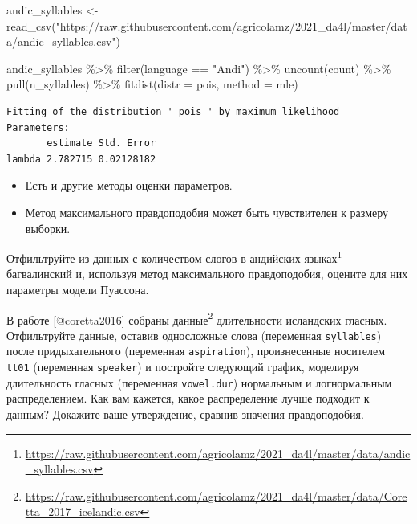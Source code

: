 \documentclass[
]{book}
\makeatletter
\newenvironment{Shaded}{\begin{snugshade}}{\end{snugshade}}
\newcommand{\AttributeTok}[1]{\textcolor[rgb]{0.77,0.63,0.00}{#1}}
\newcommand{\FunctionTok}[1]{\textcolor[rgb]{0.00,0.00,0.00}{#1}}
\newcommand{\NormalTok}[1]{#1}
\newcommand{\OtherTok}[1]{\textcolor[rgb]{0.56,0.35,0.01}{#1}}
\newcommand{\SpecialCharTok}[1]{\textcolor[rgb]{0.00,0.00,0.00}{#1}}
\newcommand{\StringTok}[1]{\textcolor[rgb]{0.31,0.60,0.02}{#1}}
\providecommand{\tightlist}{%
  \setlength{\itemsep}{0pt}\setlength{\parskip}{0pt}}
\renewcommand{\href}[2]{#2\footnote{\url{#1}}}
\newenvironment{kframe}{%
    \medskip{}
    \setlength{\fboxsep}{.8em}
    \def\at@end@of@kframe{}%
    \ifinner\ifhmode%
    \def\at@end@of@kframe{\end{minipage}}%
    \begin{minipage}{\columnwidth}%
    \fi\fi%
    \def\FrameCommand##1{\hskip\@totalleftmargin \hskip-\fboxsep
    \colorbox{shadecolor}{##1}\hskip-\fboxsep
        \hskip-\linewidth \hskip-\@totalleftmargin \hskip\columnwidth}%
    \MakeFramed {\advance\hsize-\width
      \@totalleftmargin\z@ \linewidth\hsize
      \@setminipage}}%
  {\par\unskip\endMakeFramed%
    \at@end@of@kframe}
\newenvironment{rmdblock}[1]
  {
    \begin{itemize}
    \renewcommand{\labelitemi}{
      \raisebox{-.7\height}[0pt][0pt]{
        {\setkeys{Gin}{width=3em,keepaspectratio}\texttt{[image: images/\#1]}}
        }
        }
        \setlength{\fboxsep}{1em}
        \begin{kframe}
        \item
      }
      {
        \end{kframe}
        \end{itemize}
      }
\newenvironment{rmdtask}
      {\begin{rmdblock}{task}}
      {\end{rmdblock}}
\makeatother
\begin{document}
\begin{Shaded}
\begin{Highlighting}[]
\NormalTok{andic\_syllables }\OtherTok{\textless{}{-}} \FunctionTok{read\_csv}\NormalTok{(}\StringTok{"https://raw.githubusercontent.com/agricolamz/2021\_da4l/master/data/andic\_syllables.csv"}\NormalTok{) }

\NormalTok{andic\_syllables }\SpecialCharTok{\%\textgreater{}\%} 
  \FunctionTok{filter}\NormalTok{(language }\SpecialCharTok{==} \StringTok{"Andi"}\NormalTok{) }\SpecialCharTok{\%\textgreater{}\%} 
  \FunctionTok{uncount}\NormalTok{(count) }\SpecialCharTok{\%\textgreater{}\%} 
  \FunctionTok{pull}\NormalTok{(n\_syllables) }\SpecialCharTok{\%\textgreater{}\%} 
  \FunctionTok{fitdist}\NormalTok{(}\AttributeTok{distr =} \StringTok{\textquotesingle{}pois\textquotesingle{}}\NormalTok{, }\AttributeTok{method =} \StringTok{\textquotesingle{}mle\textquotesingle{}}\NormalTok{)}
\end{Highlighting}
\end{Shaded}

\begin{verbatim}
Fitting of the distribution ' pois ' by maximum likelihood 
Parameters:
       estimate Std. Error
lambda 2.782715 0.02128182
\end{verbatim}

\begin{itemize}
\tightlist
\item
  Есть и другие методы оценки параметров.
\item
  Метод максимального правдоподобия может быть чувствителен к размеру выборки.
\end{itemize}

\begin{rmdtask}
Отфильтруйте из
\href{https://raw.githubusercontent.com/agricolamz/2021_da4l/master/data/andic_syllables.csv}{данных
с количеством слогов в андийских языках} багвалинский и, используя метод
максимального правдоподобия, оцените для них параметры модели Пуассона.
\end{rmdtask}

\begin{rmdtask}
В работе {[}@coretta2016{]} собраны
\href{https://raw.githubusercontent.com/agricolamz/2021_da4l/master/data/Coretta_2017_icelandic.csv}{данные}
длительности исландских гласных. Отфильтруйте данные, оставив
односложные слова (переменная \texttt{syllables}) после придыхательного
(переменная \texttt{aspiration}), произнесенные носителем \texttt{tt01}
(переменная \texttt{speaker}) и постройте следующий график, моделируя
длительность гласных (переменная \texttt{vowel.dur}) нормальным и
логнормальным распределением. Как вам кажется, какое распределение лучше
подходит к данным? Докажите ваше утверждение, сравнив значения
правдоподобия.
\end{rmdtask}
\end{document}
